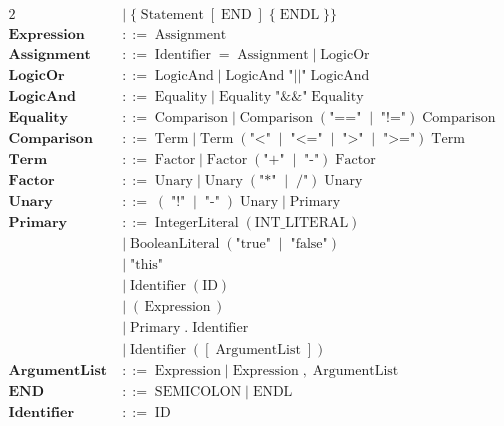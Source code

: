 \documentclass[a4paper,11pt]{article}
\begin{document}
\begin{alignat*}{2}
  \;&\mid\; \{\;\text{Statement}\;[\;\text{END}\;]\;\{\;\text{ENDL}\;\}\} \\[4pt]
\textbf{Expression}
  \;&::=\; \text{Assignment} \\[4pt]
\textbf{Assignment}
  \;&::=\; \text{Identifier}\;=\;\text{Assignment}
   \;|\;\text{LogicOr} \\[4pt]
\textbf{LogicOr}
  \;&::=\; \text{LogicAnd}
   \;|\;\text{LogicAnd}\;\text{"||"}\;\text{LogicAnd} \\[4pt]
\textbf{LogicAnd}
  \;&::=\; \text{Equality}
   \;|\;\text{Equality}\;\text{"&&"}\;\text{Equality} \\[4pt]
\textbf{Equality}
  \;&::=\; \text{Comparison}
   \;|\;\text{Comparison}\;(\text{"=="}\;\mid\;\text{"!="})\;\text{Comparison} \\[4pt]
\textbf{Comparison}
  \;&::=\; \text{Term}
   \;|\;\text{Term}\;(\text{"<"}\;\mid\;\text{"<="}\;\mid\;\text{">"}\;\mid\;\text{">="})\;\text{Term} \\[4pt]
\textbf{Term}
  \;&::=\; \text{Factor}
   \;|\;\text{Factor}\;(\text{"+"}\;\mid\;\text{"-"})\;\text{Factor} \\[4pt]
\textbf{Factor}
  \;&::=\; \text{Unary}
   \;|\;\text{Unary}\;(\text{"*"}\;\mid\;\text{/"})\;\text{Unary} \\[4pt]
\textbf{Unary}
  \;&::=\; (\;\text{"!"}\;\mid\;\text{"-"}\;)\;\text{Unary}
   \;|\;\text{Primary} \\[4pt]
\textbf{Primary}
  \;&::=\; \text{IntegerLiteral}\;( \text{INT\_LITERAL} ) \\[2pt]
  \;&\mid\; \text{BooleanLiteral}\;( \text{"true"}\;\mid\;\text{"false"} ) \\[2pt]
  \;&\mid\; \text{"this"} \\[2pt]
  \;&\mid\; \text{Identifier}\;( \text{ID} ) \\[2pt]
  \;&\mid\; (\,\text{Expression}\,) \\[2pt]
  \;&\mid\; \text{Primary}\;.\;\text{Identifier} \\[2pt]
  \;&\mid\; \text{Identifier}\;( [\;\text{ArgumentList}\;] ) \\[4pt]
\textbf{ArgumentList}
  \;&::=\; \text{Expression}
   \;|\;\text{Expression}\;,\;\text{ArgumentList} \\[4pt]
\textbf{END}
  \;&::=\; \text{SEMICOLON}
   \;|\;\text{ENDL} \\[4pt]
\textbf{Identifier}
  \;&::=\; \text{ID} \\[4pt]
\end{alignat*}
\end{document}
